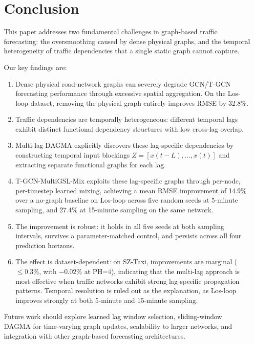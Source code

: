 \section{Conclusion}\label{sec:conclusion}

This paper addresses two fundamental challenges in graph-based traffic forecasting: the oversmoothing caused by dense physical graphs, and the temporal heterogeneity of traffic dependencies that a single static graph cannot capture.

Our key findings are:

\begin{enumerate}
    \item Dense physical road-network graphs can severely degrade GCN/T-GCN forecasting performance through excessive spatial aggregation. On the Los-loop dataset, removing the physical graph entirely improves RMSE by 32.8\%.

    \item Traffic dependencies are temporally heterogeneous: different temporal lags exhibit distinct functional dependency structures with low cross-lag overlap.

    \item Multi-lag DAGMA explicitly discovers these lag-specific dependencies by constructing temporal input blockings $Z = [x(t{-}L), \ldots, x(t)]$ and extracting separate functional graphs for each lag.

    \item T-GCN-MultiGSL-Mix exploits these lag-specific graphs through per-node, per-timestep learned mixing, achieving a mean RMSE improvement of 14.9\% over a no-graph baseline on Los-loop across five random seeds at 5-minute sampling, and 27.4\% at 15-minute sampling on the same network.

    \item The improvement is robust: it holds in all five seeds at both sampling intervals, survives a parameter-matched control, and persists across all four prediction horizons.

    \item The effect is dataset-dependent: on SZ-Taxi, improvements are marginal ($\leq0.3\%$, with $-0.02\%$ at PH=4), indicating that the multi-lag approach is most effective when traffic networks exhibit strong lag-specific propagation patterns. Temporal resolution is ruled out as the explanation, as Los-loop improves strongly at both 5-minute and 15-minute sampling.
\end{enumerate}

Future work should explore learned lag window selection, sliding-window DAGMA for time-varying graph updates, scalability to larger networks, and integration with other graph-based forecasting architectures.
